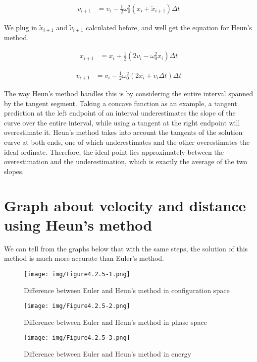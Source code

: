 \documentclass[12pt]{article}
\begin{document}
\begin{align}
    v_{i+1} &= v_{i} - \frac{1}{2} \omega_{0}^2 (x_{i} + \tilde{x}_{i+1}) \Delta t
\end{align}

We plug in $\tilde{x}_{i+1}$ and $\tilde{v}_{i+1}$ calculated before, and well get the equation for Heun's method. 

\begin{align}
    x_{i+1} &= x_{i} + \frac{1}{2} (2v_{i} - \omega_{0}^2 x_{i}) \Delta t
\end{align}

\begin{align}
    v_{i+1} &= v_{i} - \frac{1}{2} \omega_{0}^2 (2x_{i} + v_{i} \Delta t) \Delta t
\end{align}

The way Heun's method handles this is by considering the entire interval spanned by the tangent segment. Taking a concave function as an example, a tangent prediction at the left endpoint of an interval underestimates the slope of the curve over the entire interval, while using a tangent at the right endpoint will overestimate it. Heun's method takes into account the tangents of the solution curve at both ends, one of which underestimates and the other overestimates the ideal ordinate. Therefore, the ideal point lies approximately between the overestimation and the underestimation, which is exactly the average of the two slopes.

\section{Graph about velocity and distance using Heun's method}

We can tell from the graphs below that with the same steps, the solution of this method is much more accurate than Euler's method. 

\begin{figure}[htb]
    \centering
    \texttt{[image: img/Figure4.2.5-1.png]}
    \caption{Difference between Euler and Heun's method in configuration space}
\end{figure} 

\begin{figure}[htb]
    \centering
    \texttt{[image: img/Figure4.2.5-2.png]}
    \caption{Difference between Euler and Heun's method in phase space}
\end{figure} 

\begin{figure}[htb]
    \centering
    \texttt{[image: img/Figure4.2.5-3.png]}
    \caption{Difference between Euler and Heun's method in energy}
\end{figure} 
\end{document}
